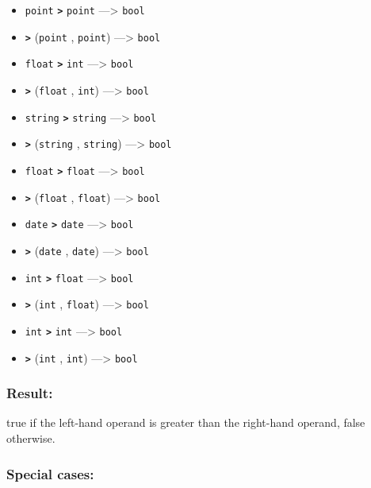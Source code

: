 \documentclass[]{book}
\providecommand{\tightlist}{%
  \setlength{\itemsep}{0pt}\setlength{\parskip}{0pt}}
\theoremstyle{definition}
\theoremstyle{definition}
\theoremstyle{definition}
\theoremstyle{remark}
\begin{document}
\begin{itemize}
\tightlist
\item
  \texttt{point} \textbf{\texttt{\textgreater{}}} \texttt{point}
  ---\textgreater{} \texttt{bool}
\item
  \textbf{\texttt{\textgreater{}}} (\texttt{point} , \texttt{point})
  ---\textgreater{} \texttt{bool}
\item
  \texttt{float} \textbf{\texttt{\textgreater{}}} \texttt{int}
  ---\textgreater{} \texttt{bool}
\item
  \textbf{\texttt{\textgreater{}}} (\texttt{float} , \texttt{int})
  ---\textgreater{} \texttt{bool}
\item
  \texttt{string} \textbf{\texttt{\textgreater{}}} \texttt{string}
  ---\textgreater{} \texttt{bool}
\item
  \textbf{\texttt{\textgreater{}}} (\texttt{string} , \texttt{string})
  ---\textgreater{} \texttt{bool}
\item
  \texttt{float} \textbf{\texttt{\textgreater{}}} \texttt{float}
  ---\textgreater{} \texttt{bool}
\item
  \textbf{\texttt{\textgreater{}}} (\texttt{float} , \texttt{float})
  ---\textgreater{} \texttt{bool}
\item
  \texttt{date} \textbf{\texttt{\textgreater{}}} \texttt{date}
  ---\textgreater{} \texttt{bool}
\item
  \textbf{\texttt{\textgreater{}}} (\texttt{date} , \texttt{date})
  ---\textgreater{} \texttt{bool}
\item
  \texttt{int} \textbf{\texttt{\textgreater{}}} \texttt{float}
  ---\textgreater{} \texttt{bool}
\item
  \textbf{\texttt{\textgreater{}}} (\texttt{int} , \texttt{float})
  ---\textgreater{} \texttt{bool}
\item
  \texttt{int} \textbf{\texttt{\textgreater{}}} \texttt{int}
  ---\textgreater{} \texttt{bool}
\item
  \textbf{\texttt{\textgreater{}}} (\texttt{int} , \texttt{int})
  ---\textgreater{} \texttt{bool}
\end{itemize}

\subsubsection{Result:}\label{result-13}

true if the left-hand operand is greater than the right-hand operand,
false otherwise.

\subsubsection{Special cases:}\label{special-cases-11}
\end{document}
